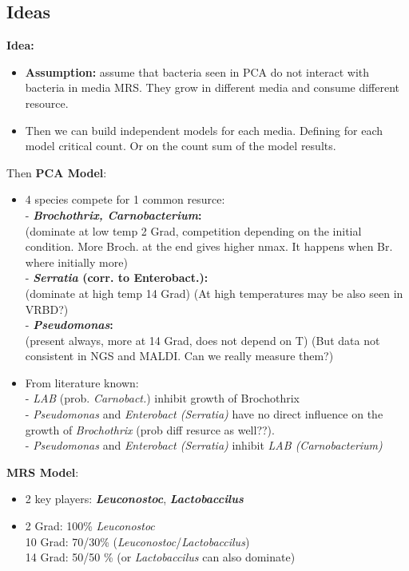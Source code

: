 \documentclass[10pt,A4paper]{article}
\begin{document}
\newpage
\subsection{Ideas}
\textbf{Idea:}
\begin{itemize}
    \item \textbf{Assumption:} assume that bacteria seen in PCA do not interact with bacteria in media MRS. 
    They grow in different media and consume different resource. 
    \item Then we can build independent models for each media. Defining for each model critical count.
    Or on the count sum of the model results.
\end{itemize}
Then \textbf{PCA Model}:\\
\begin{itemize}
    \item 4 species compete for 1 common resurce: \\
          - \textbf{\textit{Brochothrix, Carnobacterium}:} \\
          (dominate at low temp 2 Grad, competition depending on the initial condition. More Broch. at the end gives higher nmax.
          It happens when Br. where initially more)\\
          - \textbf{\textit{Serratia} (corr. to Enterobact.):}\\
           (dominate at high temp 14 Grad)
           (At high temperatures may be also seen in VRBD?)\\
          - \textbf{\textit{Pseudomonas}:}\\
           (present always, more at 14 Grad, does not depend on T)
           (But data not consistent in NGS and MALDI. Can we really measure them?)\\
    \item From literature known:\\
          - \textit{LAB} (prob. \textit{Carnobact.}) inhibit growth of Brochothrix\\
          - \textit{Pseudomonas} and \textit{Enterobact (Serratia)} have no direct influence on the growth of \textit{Brochothrix} (prob diff resurce as well??).\\
          - \textit{Pseudomonas} and \textit{Enterobact (Serratia)} inhibit \textit{LAB (Carnobacterium)}\\
\end{itemize}

\textbf{MRS Model}:
\begin{itemize}
    \item 2 key players: \textbf{\textit{Leuconostoc}}, \textbf{\textit{Lactobaccilus}} \\
    \item 2 Grad: 100\% \textit{Leuconostoc}\\
          10 Grad: 70/30\% (\textit{Leuconostoc}/\textit{Lactobaccilus})\\
          14 Grad: 50/50 \% (or \textit{Lactobaccilus} can also dominate)
\end{itemize}
\end{document}
